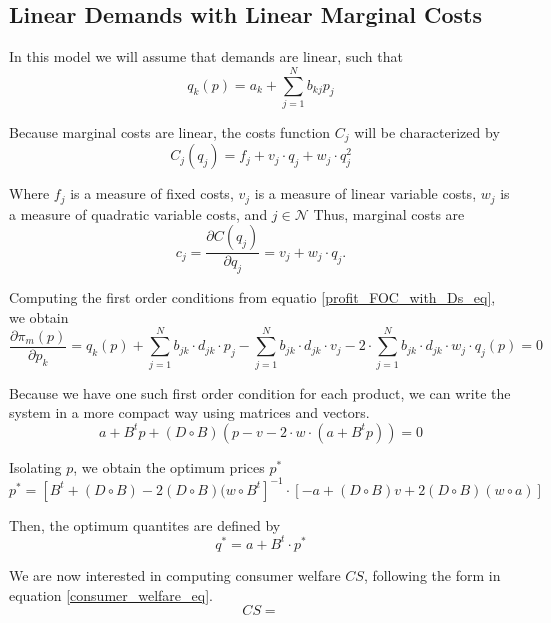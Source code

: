 \documentclass[12pt]{article}
\begin{document}
\subsection{Linear Demands with Linear Marginal Costs}

In this model we will assume that demands are linear, such that
\begin{equation*}
q_k(p) = a_k + \sum_{j=1}^N b_{kj}p_j
\end{equation*}

Because marginal costs are linear, the costs function $C_j$ will be characterized by
\begin{equation*}
C_j(q_j) = f_j + v_j \cdot q_j + w_j \cdot q_j^2
\end{equation*}

Where $f_j$ is a measure of fixed costs, $v_j$ is a measure of linear variable costs, $w_j$ is a measure of quadratic variable costs, and $j \in \mathcal{N}$ Thus, marginal costs are
\begin{equation*}
c_j = \frac{\partial C(q_j)}{\partial q_j}= v_j + w_j \cdot q_j.
\end{equation*}

Computing the first order conditions from equatio \ref{profit_FOC_with_Ds_eq}, we obtain
\begin{equation*}
\frac{\partial\pi_m(p)}{\partial p_k} = q_k(p) + \sum_{j = 1}^N b_{jk} \cdot d_{jk} \cdot p_j - \sum_{j = 1}^N b_{jk} \cdot d_{jk} \cdot v_j - 2 \cdot \sum_{j = 1}^N b_{jk} \cdot d_{jk} \cdot w_j \cdot q_j (p) = 0
\end{equation*}

Because we have one such first order condition for each product, we can write the system in a more compact way using matrices and vectors. 
\begin{equation*}
a + B ^ t p + (D \circ B)(p - v - 2 \cdot w \cdot (a + B^t p)) = 0
\end{equation*}

Isolating $p$, we obtain the optimum prices $p^*$
\begin{equation*}
p^* = [B^t + (D \circ B) - 2 (D \circ B)(w \circ B^t]^{-1} \cdot [-a + (D \circ B) v + 2 (D \circ B)(w \circ a)]
\end{equation*}

Then, the optimum quantites are defined by
\begin{equation*}
q^* = a + B^t \cdot p^*
\end{equation*}

We are now interested in computing consumer welfare $CS$, following the form in equation \ref{consumer_welfare_eq}.
\begin{equation*}
CS = 
\end{equation*}
\end{document}
